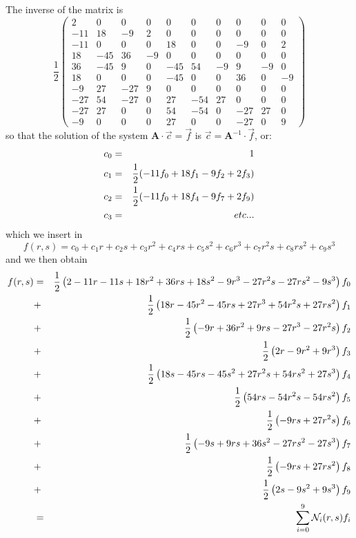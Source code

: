 The inverse of the matrix is 
\[
\frac12
\left(
\begin{array}{cccccccccc}
2 &0 &0 &0 &0 &0 &0 &0 &0 &0\\
-11 & 18 & -9 & 2 &0 &0 &0 &0 &0 & 0 \\
-11 & 0 & 0 & 0 & 18 & 0 & 0 & -9 & 0 & 2 \\
18 & -45 & 36 &-9 &  0& 0& 0& 0& 0& 0 \\
36 &-45 & 9 & 0 &  -45 & 54 &-9 & 9 &  -9 & 0\\
18 &0& 0& 0 & -45& 0 &0 & 36& 0 &-9 \\
-9 & 27 &-27 & 9 &  0 & 0 & 0 & 0  &  0 & 0\\
-27 & 54& -27& 0& 27 &-54 & 27 &0 &0 &0 \\
-27 & 27 &0 &0 &54& -54 &0 &-27  &  27 &0 \\
-9 &0 &0 &0 &27 &0& 0 &-27 &0&  9
\end{array}
\right)
\]
so that the solution of the system ${\bm A}\cdot \vec{c}=\vec{f}$ is
$\vec{c} = {\bm A}^{-1}\cdot \vec{f}$, or:
\begin{eqnarray}
c_0 &=& 1   \nonumber\\
c_1 &=& \frac12 (-11 f_0 + 18 f_1 -9 f_2 + 2f_3 ) \nonumber\\
c_2 &=& \frac12 (-11f_0 + 18f_4 -9 f_7 + 2f_9) \nonumber\\
c_3 &=& etc ...
\end{eqnarray}
which we insert in 
\[
f(r,s) = c_0 + c_1 r+ c_2 s + c_3r^2 + c_4 rs + c_5 s^2
+c_6 r^3 + c_7 r^2s + c_8 rs^2 + c_9 s^3
\]
and we then obtain
\begin{eqnarray}
f(r,s) 
&=&\frac12\left(2-11r-11s+18r^2+36rs+18s^2-9r^3-27r^2s-27rs^2-9s^3 \right) f_0 \nonumber\\
&+&\frac12\left(18r-45r^2-45rs +27r^3 +54r^2s+27rs^2\right) f_1\nonumber\\
&+&\frac12\left( -9r+36r^2+9rs -27r^3 -27r^2s \right) f_2\nonumber\\
&+&\frac12\left( 2r-9r^2+9r^3 \right) f_3\nonumber\\
&+&\frac12\left( 18s -45rs-45s^2+27r^2s+54rs^2+27s^3\right) f_4\nonumber\\
&+&\frac12\left( 54rs-54r^2s-54rs^2  \right) f_5\nonumber\\
&+&\frac12\left( -9rs+27r^2s  \right) f_6\nonumber\\
&+&\frac12\left( -9s+9rs+36s^2-27rs^2-27s^3  \right) f_7\nonumber\\
&+&\frac12\left( -9rs+27rs^2  \right) f_8\nonumber\\
&+&\frac12\left( 2s-9s^2+9s^3  \right) f_9 \nonumber \\
&=& \sum_{i=0}^9 {\mathcal{N}}_i(r,s) f_i
\end{eqnarray}


